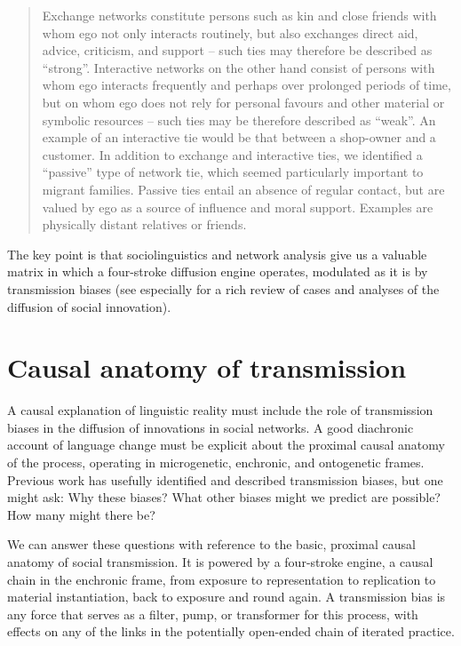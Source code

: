 \begin{quotation}
Exchange networks constitute persons such as kin and close friends with whom ego not only interacts routinely, but also exchanges direct aid, \mbox{advice}, criticism, and support -- such ties may therefore be described as ``strong''.  Interactive networks on the other hand consist of persons with whom ego interacts frequently and perhaps over prolonged periods of time, but on whom ego does not rely for personal favours and other material or symbolic resources -- such ties may be therefore described as ``weak''. An example of an interactive tie would be that between a shop-owner and a customer. In addition to exchange and interactive ties, we identified a ``passive'' type of network tie, which seemed particularly important to migrant families. Passive ties entail an absence of regular contact, but are valued by ego as a source of influence and moral support. Examples are physically distant relatives or friends. \citep[138--139]{milroy_social_1995}
\end{quotation}

The key point is that sociolinguistics and network analysis give us a valuable matrix in which a four-stroke diffusion engine operates, modulated as it is by transmission biases (see especially \citealt{rogers_diffusion_2003} for a rich review of cases and analyses of the diffusion of social innovation).

\section{Causal anatomy of transmission}



A causal explanation of linguistic reality must include the role of transmission biases in the diffusion of innovations in social networks. A good diachronic account of language change must be explicit about the proximal causal 
anatomy of the process, operating in microgenetic, enchronic, and ontogenetic frames. Previous work has usefully identified and 
described transmission biases, but one might ask: Why these biases? What 
other biases might we predict are possible? How many might there be? 



We can answer these questions with reference to the basic, proximal causal anatomy of social transmission. It is powered by a four-stroke engine, a causal chain in the enchronic frame, from 
exposure to representation to replication to material instantiation, 
back to exposure and round again. A transmission 
bias is any force that serves as a filter, pump, or transformer for this 
process, with effects on any of the links in the potentially open-ended chain of iterated practice. 

